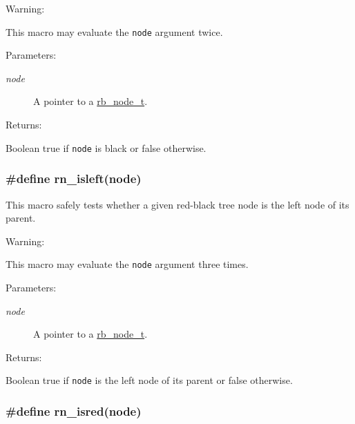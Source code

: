 \begin{Desc}
\item[Warning: ]\par
This macro may evaluate the {\tt node} argument twice.\end{Desc}
\begin{Desc}
\item[Parameters: ]\par
\begin{description}
\item[{\em 
node}]A pointer to a \hyperlink{group__dbprim__rbtree_a1}{rb\_\-node\_\-t}.\end{description}
\end{Desc}
\begin{Desc}
\item[Returns: ]\par
Boolean true if {\tt node} is black or false otherwise. \end{Desc}
\hypertarget{group__dbprim__rbtree_a36}{
\subsubsection[rn\_\-isleft]{\setlength{\rightskip}{0pt plus 5cm}\#define rn\_\-isleft(node)}}
\label{group__dbprim__rbtree_a36}


This macro safely tests whether a given red-black tree node is the left node of its parent.

\begin{Desc}
\item[Warning: ]\par
This macro may evaluate the {\tt node} argument three times.\end{Desc}
\begin{Desc}
\item[Parameters: ]\par
\begin{description}
\item[{\em 
node}]A pointer to a \hyperlink{group__dbprim__rbtree_a1}{rb\_\-node\_\-t}.\end{description}
\end{Desc}
\begin{Desc}
\item[Returns: ]\par
Boolean true if {\tt node} is the left node of its parent or false otherwise. \end{Desc}
\hypertarget{group__dbprim__rbtree_a35}{
\subsubsection[rn\_\-isred]{\setlength{\rightskip}{0pt plus 5cm}\#define rn\_\-isred(node)}}
\label{group__dbprim__rbtree_a35}



